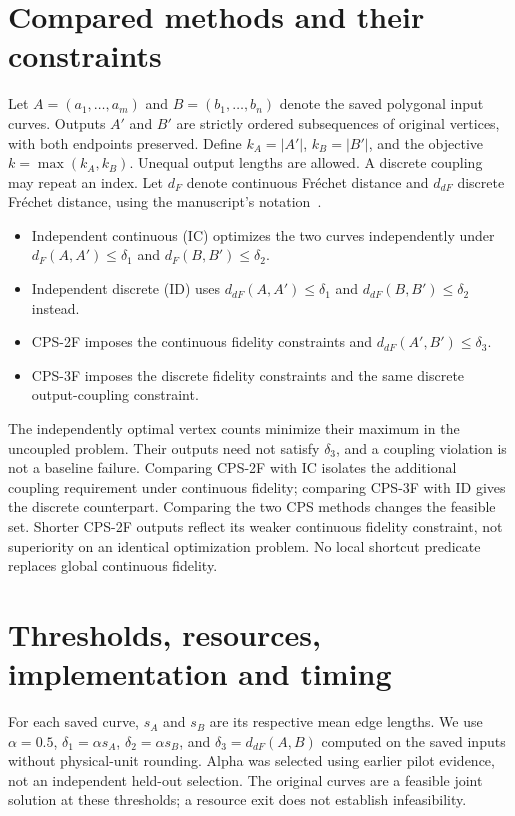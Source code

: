 \section{Compared methods and their constraints}
Let $A=(a_1,\ldots,a_m)$ and $B=(b_1,\ldots,b_n)$ denote the saved polygonal input curves. Outputs $A'$ and $B'$ are strictly ordered subsequences of original vertices, with both endpoints preserved. Define $k_A=|A'|$, $k_B=|B'|$, and the objective $k=\max(k_A,k_B)$. Unequal output lengths are allowed. A discrete coupling may repeat an index. Let $d_F$ denote continuous Fr\'echet distance and $d_{dF}$ discrete Fr\'echet distance, using the manuscript's notation~\cite{manuscript}.
\begin{itemize}
\item Independent continuous (IC) optimizes the two curves independently under $d_F(A,A')\leq\delta_1$ and $d_F(B,B')\leq\delta_2$.
\item Independent discrete (ID) uses $d_{dF}(A,A')\leq\delta_1$ and $d_{dF}(B,B')\leq\delta_2$ instead.
\item CPS-2F imposes the continuous fidelity constraints and $d_{dF}(A',B')\leq\delta_3$.
\item CPS-3F imposes the discrete fidelity constraints and the same discrete output-coupling constraint.
\end{itemize}
The independently optimal vertex counts minimize their maximum in the uncoupled problem. Their outputs need not satisfy $\delta_3$, and a coupling violation is not a baseline failure. Comparing CPS-2F with IC isolates the additional coupling requirement under continuous fidelity; comparing CPS-3F with ID gives the discrete counterpart. Comparing the two CPS methods changes the feasible set. Shorter CPS-2F outputs reflect its weaker continuous fidelity constraint, not superiority on an identical optimization problem. No local shortcut predicate replaces global continuous fidelity.

\section{Thresholds, resources, implementation and timing}
For each saved curve, $s_A$ and $s_B$ are its respective mean edge lengths. We use $\alpha=0.5$, $\delta_1=\alpha s_A$, $\delta_2=\alpha s_B$, and $\delta_3=d_{dF}(A,B)$ computed on the saved inputs without physical-unit rounding. Alpha was selected using earlier pilot evidence, not an independent held-out selection. The original curves are a feasible joint solution at these thresholds; a resource exit does not establish infeasibility.

